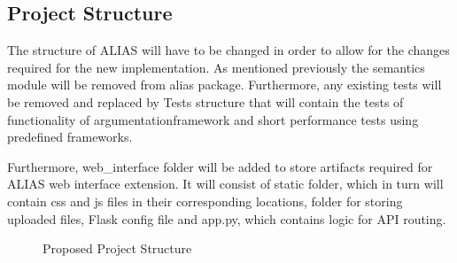 \subsection{Project Structure}
The structure of ALIAS will have to be changed in order to allow for the changes required for the new implementation. As mentioned previously the semantics module will be removed from alias package. Furthermore, any existing tests will be removed and replaced by Tests structure that will contain the tests of functionality of argumentationframework and short performance tests using predefined frameworks.

Furthermore, web\_interface folder will be added to store artifacts required for ALIAS web interface extension. It will consist of static folder, which in turn will contain css and js files in their corresponding locations, folder for storing uploaded files, Flask config file and app.py, which contains logic for API routing.

\begin{figure}[!ht]
	\caption{Proposed Project Structure}
	\label{fig:structureTree}
\end{figure}